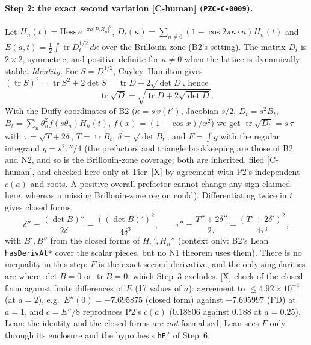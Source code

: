 \documentclass[10pt]{article}
\newcommand{\tier}[1]{\textsf{[#1]}}
\newcommand{\tX}{\tier{X}}
\newcommand{\tCh}{\tier{C-human}}
\newcommand{\lean}[1]{\texttt{#1}}
\renewcommand{\_}{\textunderscore\penalty0\hspace{0pt}}
\newcommand{\tr}{\operatorname{tr}}
\begin{document}
\paragraph{Step 2: the exact second variation \tCh{} (\texttt{PZC-C-0009}).} Let $H_n(t)=\mathrm{Hess}\,e^{-\pi a|P_tR_n|^2}$, $D_t(\kappa)=\sum_{n\ne0}(1-\cos2\pi\kappa\!\cdot\!n)H_n(t)$ and $E(a,t)=\tfrac12\int\tr D_t^{1/2}\,d\kappa$ over the Brillouin zone (B2's setting).
The matrix $D_t$ is $2\times2$, symmetric, and positive definite for $\kappa\ne0$ when the lattice is dynamically stable. \emph{Identity.} For $S=D^{1/2}$, Cayley--Hamilton gives $(\tr S)^2=\tr S^2+2\det S=\tr D+2\sqrt{\det D}$, hence
\[\tr\sqrt D=\sqrt{\tr D+2\sqrt{\det D}}.\]
With the Duffy coordinates of B2 ($\kappa=s\,v(t')$, Jacobian $s/2$, $D_t=s^2B_t$, $B_t=\sum_n\theta_n^2f(s\theta_n)H_n(t)$, $f(x)=(1-\cos x)/x^2$) we get $\tr\sqrt{D_t}=s\,\tau$ with
$\tau=\sqrt{T+2\delta}$, $T=\tr B_t$, $\delta=\sqrt{\det B_t}$, and $F=\int g$ with the regular integrand $g=s^2\tau''/4$ (the prefactors and triangle bookkeeping are those of B2 and N2, and so is the Brillouin-zone coverage; both are inherited, filed \tCh, and checked here only at Tier~\tX{} by agreement with P2's independent $c(a)$ and roots. A positive overall prefactor cannot change any sign claimed here, whereas a missing Brillouin-zone region could). Differentiating twice in $t$ gives closed forms:
\[\delta''=\frac{(\det B)''}{2\delta}-\frac{((\det B)')^2}{4\delta^3},\qquad
\tau''=\frac{T''+2\delta''}{2\tau}-\frac{(T'+2\delta')^2}{4\tau^3},\]
with $B',B''$ from the closed forms of $H_n',H_n''$ (context only: B2's Lean \lean{hasDerivAt\_*} cover the scalar pieces, but no N1 theorem uses them). There is no inequality in this step: $F$ is the exact second derivative, and the only singularities are where $\det B=0$ or $\tr B=0$, which Step~3 excludes.
\tX{} check of the closed form against finite differences of $E$ (17 values of $a$): agreement to $\le4.92\times10^{-4}$ (at $a=2$), e.g.\ $E''(0)=-7.695875$ (closed form) against $-7.695997$ (FD) at $a=1$, and $c=E''/8$ reproduces P2's $c(a)$ ($0.18806$ against $0.188$ at $a=0.25$).
Lean: the identity and the closed forms are \emph{not} formalised; Lean sees $F$ only through its enclosure and the hypothesis \lean{hE'} of Step~6.
\end{document}
